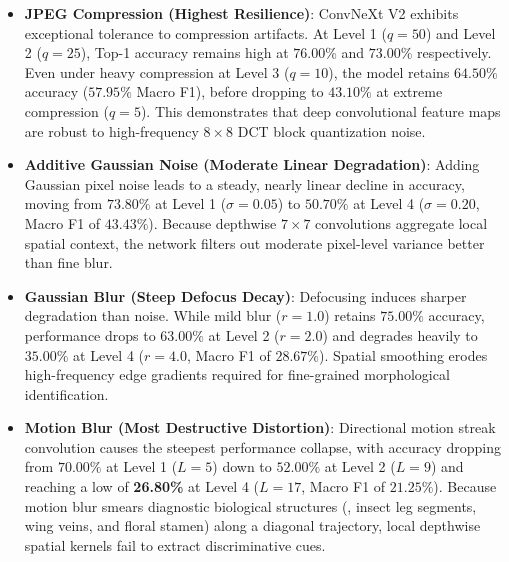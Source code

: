 \begin{itemize}
  \item \textbf{JPEG Compression (Highest Resilience)}: ConvNeXt V2 exhibits exceptional tolerance to compression artifacts. At Level 1 ($q=50$) and Level 2 ($q=25$), Top-1 accuracy remains high at $76.00\%$ and $73.00\%$ respectively. Even under heavy compression at Level 3 ($q=10$), the model retains $64.50\%$ accuracy ($57.95\%$ Macro F1), before dropping to $43.10\%$ at extreme compression ($q=5$). This demonstrates that deep convolutional feature maps are robust to high-frequency $8 \times 8$ DCT block quantization noise.

  \item \textbf{Additive Gaussian Noise (Moderate Linear Degradation)}: Adding Gaussian pixel noise leads to a steady, nearly linear decline in accuracy, moving from $73.80\%$ at Level 1 ($\sigma=0.05$) to $50.70\%$ at Level 4 ($\sigma=0.20$, Macro F1 of $43.43\%$). Because depthwise $7 \times 7$ convolutions aggregate local spatial context, the network filters out moderate pixel-level variance better than fine blur.

  \item \textbf{Gaussian Blur (Steep Defocus Decay)}: Defocusing induces sharper degradation than noise. While mild blur ($r=1.0$) retains $75.00\%$ accuracy, performance drops to $63.00\%$ at Level 2 ($r=2.0$) and degrades heavily to $35.00\%$ at Level 4 ($r=4.0$, Macro F1 of $28.67\%$). Spatial smoothing erodes high-frequency edge gradients required for fine-grained morphological identification.

  \item \textbf{Motion Blur (Most Destructive Distortion)}: Directional motion streak convolution causes the steepest performance collapse, with accuracy dropping from $70.00\%$ at Level 1 ($L=5$) down to $52.00\%$ at Level 2 ($L=9$) and reaching a low of \textbf{26.80\%} at Level 4 ($L=17$, Macro F1 of $21.25\%$). Because motion blur smears diagnostic biological structures (\eg, insect leg segments, wing veins, and floral stamen) along a diagonal trajectory, local depthwise spatial kernels fail to extract discriminative cues.
\end{itemize}
